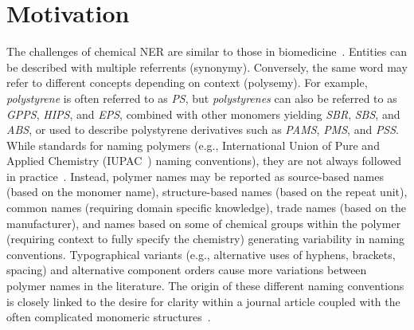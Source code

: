 \section{Motivation}
\label{sect:background}
The challenges of chemical NER are similar to those in biomedicine~\cite{krallinger2015chemdner,kim2004introduction}. 
Entities can be described with multiple referrents (synonymy).
Conversely, the same word may refer to different concepts depending on context (polysemy).
For example,
\textit{polystyrene} is often referred to as \textit{PS}, but \textit{polystyrenes} can also be referred to as \textit{GPPS}, \textit{HIPS}, and \textit{EPS}, combined with other monomers yielding \textit{SBR}, \textit{SBS}, and \textit{ABS}, or used to describe polystyrene derivatives such as \textit{PAMS}, \textit{PMS}, and \textit{PSS}.
While standards for naming polymers (e.g., International Union of Pure and Applied Chemistry (IUPAC~\cite{hiorns2013brief}) naming conventions), they are not always followed in practice~\cite{tamames2006success}. 
Instead, polymer names may be reported as source-based names (based on the monomer name), structure-based names (based on the repeat unit), common names (requiring domain specific knowledge), trade names (based on the manufacturer), and names based on some of chemical groups within the polymer (requiring context to fully specify the chemistry) generating variability in naming conventions.
Typographical variants (e.g., alternative uses of hyphens, brackets, spacing) and alternative component orders cause more variations between polymer names in the literature.
The origin of these different naming conventions is closely linked to the desire for clarity within a journal article coupled with the often complicated monomeric structures~\cite{audus2017polymer}.


